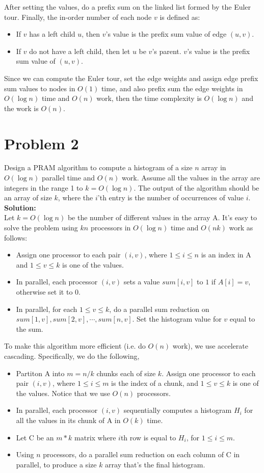 \documentclass{article}
\begin{document}
After setting the values, do a prefix sum on the linked list formed by the Euler tour. Finally, the in-order number of each node $v$ is defined as:
\begin{itemize}
    \item If $v$ has a left child $u$, then $v$'s value is the prefix sum value of edge $(u,v)$.
    \item If $v$ do not have a left child, then let $u$ be $v$'s parent. $v$'s value is the prefix sum value of $(u,v)$.
\end{itemize} 
Since we can compute the Euler tour, set the edge weights and assign edge prefix sum values to nodes in $O(1)$ time, and also prefix sum the edge weights in $O(\log n)$ time and $O(n)$ work, then the time complexity is $O(\log n)$ and the work is $O(n)$.

\section{Problem 2}
Design a PRAM algorithm to compute a histogram of a size $n$ array in $O(\log n)$
parallel time and $O(n)$ work. Assume all the values in the array are integers in 
the range 1 to $k= O(\log n)$. The output of the algorithm should be an array of
size $k$, where the $i$'th entry is the number of occurrences of value $i$.
\\\textbf{Solution: }\\
Let $k=O(\log n)$ be the number of different values in the array A. It's easy to solve the problem using $kn$ processors in $O(\log n)$ time and $O(nk)$ work as follows:
\begin{itemize}
    \item Assign one processor to each pair $(i,v)$, where $1\leq i\leq n$ is an index in A and $1\leq v\leq k$ is one of the values.
    \item In parallel, each processor $(i,v)$ sets a value $sum[i,v]$ to $1$ if $A[i]=v$, otherwise set it to $0$.
    \item In parallel, for each $1\leq v\leq k$, do a parallel sum reduction on $sum[1,v],sum[2,v],\cdots,sum[n,v]$. Set the histogram value for $v$ equal to the sum.  
\end{itemize} 
To make this algorithm more efficient (i.e. do $O(n)$ work), we use accelerate cascading. Specifically, we do the following,
\begin{itemize}
    \item Partiton A into $m=n/k$ chunks each of size $k$. Assign one processor to each pair $(i,v)$, where $1\leq i\leq m$ is the index of a chunk, and $1\leq v\leq k$ is one of the values. Notice that we use $O(n)$ processors.
    \item In parallel, each processor $(i,v)$ sequentially computes a histogram $H_{i}$ for all the values in its chunk of A in $O(k)$ time.
    \item Let C be an $m*k$ matrix where $i$th row is equal to $H_{i}$, for $1\leq i\leq m$.
    \item Using $n$ processors, do a parallel sum reduction on each column of C in parallel, to produce a size $k$ array that's the final histogram.    
\end{itemize} 
\end{document}
